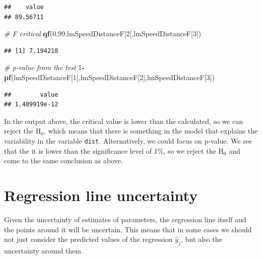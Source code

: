 \documentclass[
]{book}
\newenvironment{Shaded}{\begin{snugshade}}{\end{snugshade}}
\newcommand{\CommentTok}[1]{\textcolor[rgb]{0.56,0.35,0.01}{\textit{#1}}}
\newcommand{\DecValTok}[1]{\textcolor[rgb]{0.00,0.00,0.81}{#1}}
\newcommand{\FloatTok}[1]{\textcolor[rgb]{0.00,0.00,0.81}{#1}}
\newcommand{\FunctionTok}[1]{\textcolor[rgb]{0.13,0.29,0.53}{\textbf{#1}}}
\newcommand{\NormalTok}[1]{#1}
\newcommand{\SpecialCharTok}[1]{\textcolor[rgb]{0.81,0.36,0.00}{\textbf{#1}}}
\theoremstyle{definition}
\theoremstyle{definition}
\theoremstyle{definition}
\theoremstyle{definition}
\theoremstyle{remark}
\begin{document}
\begin{verbatim}
##    value 
## 89.56711
\end{verbatim}

\begin{Shaded}
\begin{Highlighting}[]
\CommentTok{\# F critical}
\FunctionTok{qf}\NormalTok{(}\FloatTok{0.99}\NormalTok{,lmSpeedDistanceF[}\DecValTok{2}\NormalTok{],lmSpeedDistanceF[}\DecValTok{3}\NormalTok{])}
\end{Highlighting}
\end{Shaded}

\begin{verbatim}
## [1] 7.194218
\end{verbatim}

\begin{Shaded}
\begin{Highlighting}[]
\CommentTok{\# p{-}value from the test}
\DecValTok{1}\SpecialCharTok{{-}}\FunctionTok{pf}\NormalTok{(lmSpeedDistanceF[}\DecValTok{1}\NormalTok{],lmSpeedDistanceF[}\DecValTok{2}\NormalTok{],lmSpeedDistanceF[}\DecValTok{3}\NormalTok{])}
\end{Highlighting}
\end{Shaded}

\begin{verbatim}
##        value 
## 1.489919e-12
\end{verbatim}

In the output above, the critical value is lower than the calculated, so we can reject the H\(_0\), which means that there is something in the model that explains the variability in the variable \texttt{dist}. Alternatively, we could focus on p-value. We see that the it is lower than the significance level of 1\%, so we reject the H\(_0\) and come to the same conclusion as above.

\section{Regression line uncertainty}\label{regression-line-uncertainty}

Given the uncertainty of estimates of parameters, the regression line itself and the points around it will be uncertain. This means that in some cases we should not just consider the predicted values of the regression \(\hat{y}_j\), but also the uncertainty around them.
\end{document}
